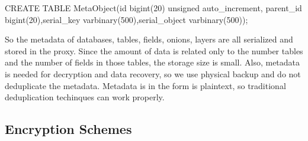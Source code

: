 CREATE TABLE MetaObject(id bigint(20) unsigned auto\_increment, parent\_id bigint(20),serial\_key varbinary(500),serial\_object varbinary(500));  


So the metadata of databases, tables, fields, onions, layers are all serialized and stored in the proxy. Since the amount of data is related only to the number tables and the number of fields in those tables, the storage size is small. Also, metadata is needed for decryption and data recovery, so we use physical backup and do not deduplicate the metadata. Metadata is in the form is plaintext, so traditional deduplication techinques can work properly.

\subsection{Encryption Schemes}

